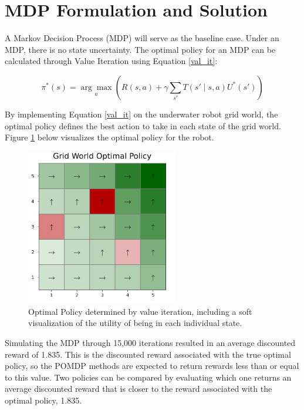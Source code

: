 \documentclass{article}
\begin{document}
\section*{MDP Formulation and Solution}
A Markov Decision Process (MDP) will serve as the baseline case.  Under an MDP, there is no state uncertainty.  The optimal policy for an MDP can be calculated through Value Iteration using Equation \ref{val_it}:

\begin{equation}\label{val_it}
    \pi^*(s) = \underset{a}{\arg\max} \left( R(s,a) + \gamma \sum_{s'}T(s' \mid s,a)U^*(s')\right)
\end{equation}


By implementing Equation \ref{val_it} on the underwater robot grid world, the optimal policy defines the best action to take in each state of the grid world.  Figure \ref{fig:optimal} below visualizes the optimal policy for the robot.

\begin{figure}[h]
    \centering
    \includegraphics[width=2.6in]{optimal.png}
    \caption{Optimal Policy determined by value iteration, including a soft visualization of the utility of being in each individual state.}
    \label{fig:optimal}
\end{figure}

Simulating the MDP through 15,000 iterations resulted in an average discounted reward of 1.835.  This is the discounted reward associated with the true optimal policy, so the POMDP methods are expected to return rewards less than or equal to this value.  Two policies can be compared by evaluating which one returns an average discounted reward that is closer to the reward associated with the optimal policy, 1.835.
\end{document}
